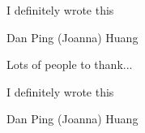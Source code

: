 \begin{declaration}
  I definitely wrote this
  \vspace*{1cm}
  \begin{flushright}
    Dan Ping (Joanna) Huang
  \end{flushright}
\end{declaration}


\begin{acknowledgements}
  Lots of people to thank...
\end{acknowledgements}

\begin{declaration}
  I definitely wrote this
  \vspace*{1cm}
  \begin{flushright}
    Dan Ping (Joanna) Huang
  \end{flushright}
\end{declaration}

\tableofcontents

